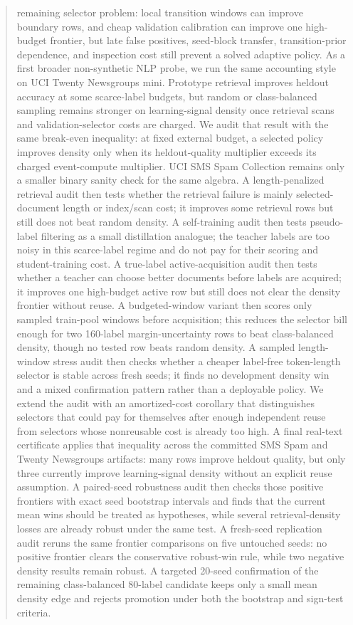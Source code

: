 \documentclass[11pt]{article}
\begin{document}
\begin{abstract}
remaining selector problem: local transition windows can improve boundary rows,
and cheap validation calibration can improve one high-budget frontier, but late
false positives, seed-block transfer, transition-prior dependence, and
inspection cost still prevent a solved adaptive policy.
As a first broader non-synthetic NLP probe, we run the same accounting style on
UCI Twenty Newsgroups mini. Prototype retrieval improves heldout accuracy at
some scarce-label budgets, but random or class-balanced sampling remains
stronger on learning-signal density once retrieval scans and validation-selector
costs are charged. We audit that result with the same break-even inequality:
at fixed external budget, a selected policy improves density only when its
heldout-quality multiplier exceeds its charged event-compute multiplier. UCI SMS
Spam Collection remains only a smaller binary sanity check for the same
algebra. A length-penalized retrieval audit then tests whether the retrieval
failure is mainly selected-document length or index/scan cost; it improves some
retrieval rows but still does not beat random density. A self-training audit
then tests pseudo-label filtering as a small distillation analogue; the teacher
labels are too noisy in this scarce-label regime and do not pay for their
scoring and student-training cost. A true-label active-acquisition audit then
tests whether a teacher can choose better documents before labels are acquired;
it improves one high-budget active row but still does not clear the density
frontier without reuse. A budgeted-window variant then scores only sampled
train-pool windows before acquisition; this reduces the selector bill enough
for two 160-label margin-uncertainty rows to beat class-balanced density, though
no tested row beats random density. A sampled length-window stress audit then
checks whether a cheaper label-free token-length selector is stable across
fresh seeds; it finds no development density win and a mixed confirmation
pattern rather than a deployable policy. We extend the audit with an
amortized-cost corollary that distinguishes selectors that could pay for
themselves after enough independent reuse from selectors whose nonreusable cost
is already too high. A final real-text certificate applies that inequality
across the committed SMS Spam and Twenty Newsgroups artifacts: many rows improve
heldout quality, but only three currently improve learning-signal density
without an explicit reuse assumption. A paired-seed robustness audit then
checks those positive frontiers with exact seed bootstrap intervals and finds
that the current mean wins should be treated as hypotheses, while several
retrieval-density losses are already robust under the same test. A fresh-seed
replication audit reruns the same frontier comparisons on five untouched seeds:
no positive frontier clears the conservative robust-win rule, while two
negative density results remain robust. A targeted 20-seed confirmation of the
remaining class-balanced 80-label candidate keeps only a small mean density
edge and rejects promotion under both the bootstrap and sign-test criteria.
\end{abstract}
\end{document}
